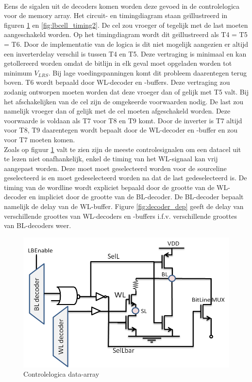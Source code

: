 \paragraph{}
Eens de sigalen uit de decoders komen worden deze gevoed in de controlelogica voor de memory array. Het circuit- en timingdiagram staan geïllustreerd in figuren \ref{fig:lbcell_timing1} en \ref{fig:lbcell_timing2}. De cel zou vroeger of tegelijk met de last moeten aangeschakeld worden. Op het timingdiagram wordt dit geïllustreerd als T4 = T5 = T6. Door de implementatie van de logica is dit niet mogelijk aangezien er altijd een inverterdelay verschil is tussen T4 en T5. Deze vertraging is minimaal en kan getollereerd worden omdat de bitlijn in elk geval moet opgeladen worden tot minimum $V_{LRS}$. Bij lage voedingspanningen komt dit probleem daarentegen terug boven. T6 wordt bepaald door WL-decoder en -buffers. Deze vertraging zou zodanig ontworpen moeten worden dat deze vroeger dan of gelijk met T5 valt. Bij het afschakelijken van de cel zijn de omgekeerde voorwaarden nodig. De last zou namelijk vroeger dan of gelijk met de cel moeten afgeschakeld worden. Deze voorwaarde is voldaan als T7 voor T8 en T9 komt. Door de inverter is T7 altijd voor T8, T9 daarentegen wordt bepaalt door de WL-decoder en -buffer en zou voor T7 moeten komen. \\
Zoals op figuur \ref{fig:lbcell_timing1} valt te zien zijn de meeste controlesignalen om een datacel uit te lezen niet onafhankelijk, enkel de timing van het WL-signaal kan vrij aangepast worden. Deze moet moet geselecteerd worden voor de sourceline geselecteerd is en moet gedeselecteerd worden na dat de last gedeselecteerd is. De timing van de wordline wordt expliciet bepaald door de grootte van de WL-decoder en impliciet door de grootte van de BL-decoder. De BL-decoder bepaalt namelijk de delay van de WL-buffer. Figure \ref{fig:decoder_dep} geeft de delay van verschillende groottes van WL-decoders en -buffers i.f.v. verschillende groottes van BL-decoders weer.

\begin{figure}[!ht]
  \centering
  \includegraphics[scale=0.6]{../fig/hfdstk-timing-lbcell1.png}
  \caption{Controlelogica data-array}
  \label{fig:lbcell_timing1}
\end{figure}

